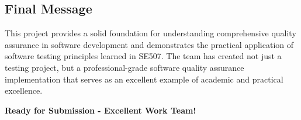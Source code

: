 \documentclass[12pt,a4paper]{article}
\begin{document}
\subsection{Final Message}

This project provides a solid foundation for understanding comprehensive quality assurance in software development and demonstrates the practical application of software testing principles learned in SE507. The team has created not just a testing project, but a professional-grade software quality assurance implementation that serves as an excellent example of academic and practical excellence.

\vspace{1cm}

\begin{center}
\textbf{\Large Ready for Submission - Excellent Work Team!}
\end{center}
\end{document}
